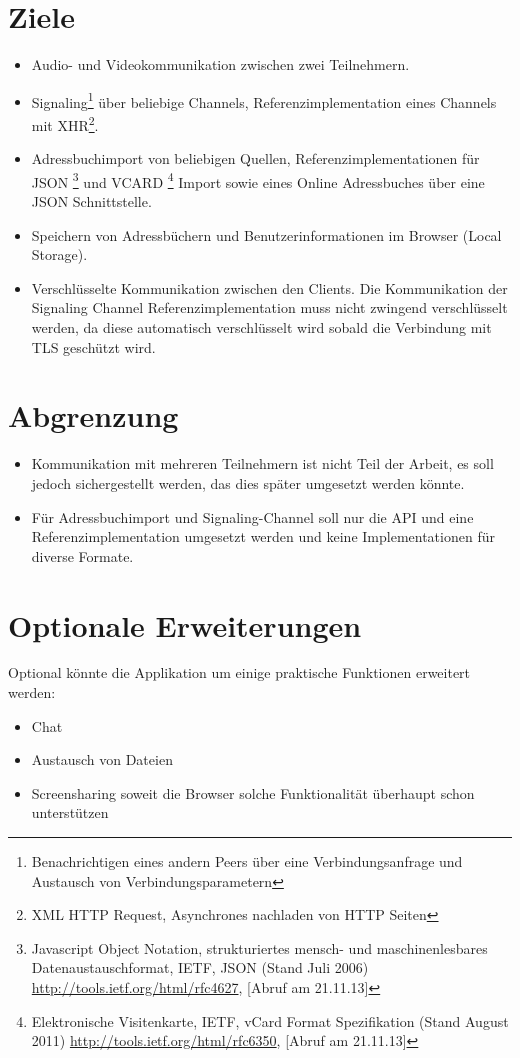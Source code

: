 	\section{Ziele}
		\begin{itemize}
			\item Audio- und Videokommunikation zwischen zwei Teilnehmern.
			\item Signaling\footnote{Benachrichtigen eines andern Peers über eine Verbindungsanfrage und Austausch von Verbindungsparametern} über beliebige Channels, Referenzimplementation eines Channels mit XHR\footnote{XML HTTP Request, Asynchrones nachladen von HTTP Seiten}.
			\item Adressbuchimport von beliebigen Quellen, Referenzimplementationen für JSON
				\footnote{Javascript Object Notation, strukturiertes mensch- und maschinenlesbares Datenaustauschformat, 
					IETF, JSON (Stand Juli 2006)
					\hyperlink{http://tools.ietf.org/html/rfc4627}{http://tools.ietf.org/html/rfc4627}, [Abruf am 21.11.13]
				} und VCARD
				\footnote{Elektronische Visitenkarte, IETF, vCard Format Spezifikation (Stand August 2011) 
					\hyperlink{http://tools.ietf.org/html/rfc6350}{http://tools.ietf.org/html/rfc6350}, [Abruf am 21.11.13]
				} Import sowie eines Online Adressbuches über eine JSON Schnittstelle.
			\item Speichern von Adressbüchern und Benutzerinformationen im Browser (Local Storage).
			\item Verschlüsselte Kommunikation zwischen den Clients. Die Kommunikation der Signaling Channel Referenzimplementation muss nicht zwingend verschlüsselt werden, da diese automatisch verschlüsselt wird sobald die Verbindung mit TLS geschützt wird.
		\end{itemize}
		
	\section{Abgrenzung}
		\begin{itemize}
			\item Kommunikation mit mehreren Teilnehmern ist nicht Teil der Arbeit, es soll jedoch sichergestellt werden, das dies später umgesetzt werden könnte.
			\item Für Adressbuchimport und Signaling-Channel soll nur die API und eine
			Referenzimplementation umgesetzt werden und keine Implementationen für diverse Formate.
		\end{itemize}
		
	\section{Optionale Erweiterungen}
		Optional könnte die Applikation um einige praktische Funktionen erweitert werden:		
		\begin{itemize}
			\item Chat
			\item Austausch von Dateien
			\item Screensharing soweit die Browser solche Funktionalität überhaupt schon unterstützen
		\end{itemize}